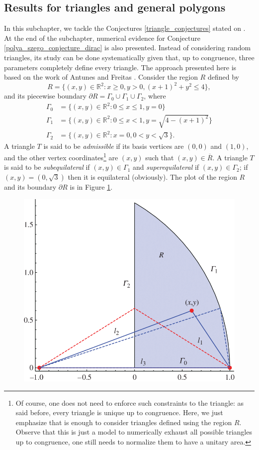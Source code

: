 \subsection{Results for triangles and general polygons}

In this subchapter, we tackle the Conjectures \ref{triangle_conjectures} stated on \cite{vu2023spectral}. At the end of the subchapter, numerical evidence for Conjecture \ref{polya_szego_conjecture_dirac} is also presented. Instead of considering random triangles, its study can be done systematically given that, up to congruence, three parameters completely define every triangle. The approach presented here is based on the work of Antunes and Freitas \cite{antunes2011inverse}. Consider the region \(R\) defined by
\[
    R = \{(x, y) \in \mathbb{R}^2: x \geq 0, y > 0, (x+1)^2 + y^2 \leq 4\},
\]
and its piecewise boundary \(\partial R = \Gamma_0 \cup \Gamma_1 \cup \Gamma_2\), where
\begin{align*}
    \Gamma_0 &= \{(x,y) \in \mathbb{R}^2: 0 \leq x \leq 1, y=0\}\\
    \Gamma_1 &= \{(x,y) \in \mathbb{R}^2: 0 \leq x < 1, y=\sqrt{4-(x+1)^2}\}\\
    \Gamma_2 &= \{(x,y) \in \mathbb{R}^2: x=0, 0 < y < \sqrt{3}\}.
\end{align*}
A triangle \(T\) is said to be \textit{admissible} if its basis vertices are \((0, 0)\) and \((1, 0)\), and the other vertex coordinates\footnote{Of course, one does not need to enforce such constraints to the triangle: as said before, every triangle is unique up to congruence. Here, we just emphasize that is enough to consider triangles defined using the region \(R\). Observe that this is just a model to numerically exhaust all possible triangles up to congruence, one still needs to normalize them to have a unitary area.} are \((x,y)\) such that \((x,y) \in \overline{R}\). A triangle \(T\) is said to be \textit{subequilateral} if \((x, y) \in \Gamma_1\) and \textit{superequilateral} if \((x, y) \in \Gamma_2\); if \((x, y) = (0, \sqrt{3})\) then it is equilateral (obviously). The plot of the region \(R\) and its boundary \(\partial R\) is in Figure \ref{dirac_triangle_model}.

\begin{figure}[!htb]
    \centering
    \includegraphics[width=0.5\linewidth]{Images/Dirac/model_triangle.png}
    \label{dirac_triangle_model}
\end{figure}

